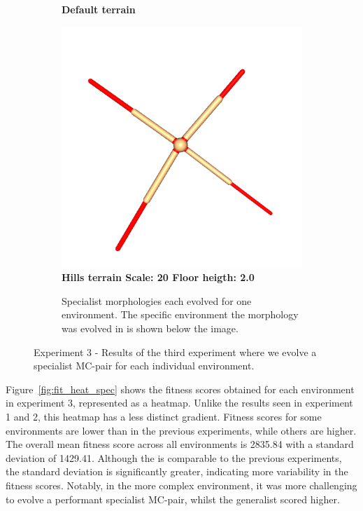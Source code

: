 \begin{figure}[!ht]
\begin{subfigure}{\textwidth}
\begin{minipage}{0.19\textwidth}
                    \textbf{Default terrain}
                \end{minipage}
                \hfill
                \begin{minipage}{0.19\textwidth}
                    \centering
                    \includegraphics[width=\linewidth]{resources/specialist_1_2835/hills_20_2.0.png}
                    \textbf{Hills terrain Scale: 20 \newline Floor heigth: 2.0}
                \end{minipage}
                \caption{Specialist morphologies each evolved for one environment. The specific environment the morphology was evolved in is shown below the image.}
                \label{fig:spec_ant_images}
            \end{subfigure}

            \caption{Experiment 3 - Results of the third experiment where we evolve a specialist MC-pair for each individual environment.}
            \label{fig:experiment3}
        \end{figure}

        Figure~\ref{fig:fit_heat_spec} shows the fitness scores obtained for each environment in experiment 3, represented as a heatmap. Unlike the results seen in experiment 1 and 2, this heatmap has a less distinct gradient. Fitness scores for some environments are lower than in the previous experiments, while others are higher. The overall mean fitness score across all environments is 2835.84 with a standard deviation of 1429.41. Although the is comparable to the previous experiments, the standard deviation is significantly greater, indicating more variability in the fitness scores. Notably, in the more complex environment, it was more challenging to evolve a performant specialist MC-pair, whilst the generalist scored higher. 
        
